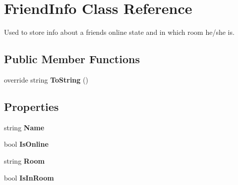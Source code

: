 \hypertarget{class_friend_info}{}\section{Friend\+Info Class Reference}
\label{class_friend_info}


Used to store info about a friend\textquotesingle{}s online state and in which room he/she is.  


\subsection*{Public Member Functions}
\begin{DoxyCompactItemize}
\item 
override string {\bfseries To\+String} ()\hypertarget{class_friend_info_a33b6ef199b025fda1898b8063f43b713}{}\label{class_friend_info_a33b6ef199b025fda1898b8063f43b713}

\end{DoxyCompactItemize}
\subsection*{Properties}
\begin{DoxyCompactItemize}
\item 
string {\bfseries Name}\hypertarget{class_friend_info_a9126b3a854a21d428ad1af0eda981bfd}{}\label{class_friend_info_a9126b3a854a21d428ad1af0eda981bfd}

\item 
bool {\bfseries Is\+Online}\hypertarget{class_friend_info_a62a8cc42bf1e25a3f8d2fdf7adbedeb3}{}\label{class_friend_info_a62a8cc42bf1e25a3f8d2fdf7adbedeb3}

\item 
string {\bfseries Room}\hypertarget{class_friend_info_a40b0b66eced3c5d88c29f6a7409d1315}{}\label{class_friend_info_a40b0b66eced3c5d88c29f6a7409d1315}

\item 
bool {\bfseries Is\+In\+Room}\hypertarget{class_friend_info_abe22fa87b796bce51e9250c46464e057}{}\label{class_friend_info_abe22fa87b796bce51e9250c46464e057}

\end{DoxyCompactItemize}


